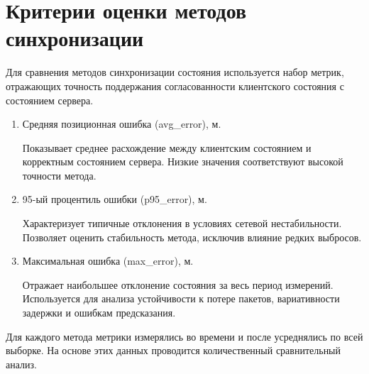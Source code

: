 \chapter{Критерии оценки методов синхронизации}

Для сравнения методов синхронизации состояния используется набор метрик,
отражающих точность поддержания согласованности клиентского состояния с
состоянием сервера.

\begin{enumerate}
    \item Средняя позиционная ошибка (avg\_error), м. 

    Показывает среднее расхождение между клиентским состоянием и корректным
    состоянием сервера. Низкие значения соответствуют высокой точности метода.

    \item 95-ый процентиль ошибки (p95\_error), м.

    Характеризует типичные отклонения в условиях сетевой нестабильности.
    Позволяет оценить стабильность метода, исключив влияние редких выбросов.

    \item Максимальная ошибка (max\_error), м.

    Отражает наибольшее отклонение состояния за весь период измерений.
    Используется для анализа устойчивости к потере пакетов, вариативности задержки
    и ошибкам предсказания.
\end{enumerate}

Для каждого метода метрики измерялись во времени и после усреднялись по всей выборке.
На основе этих данных проводится количественный сравнительный анализ.
